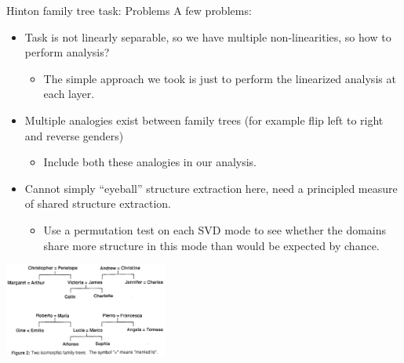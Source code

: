 \documentclass{beamer}
\begin{document}
\begin{frame}{Hinton family tree task: Problems}
A few problems:
\begin{itemize}
    \item<2-> Task is not linearly separable, so we have multiple non-linearities, so how to perform analysis?
    \begin{itemize}
	\item<3-> The simple approach we took is just to perform the linearized analysis at each layer. 
    \end{itemize}
    \item<4-> Multiple analogies exist between family trees (for example flip left to right and reverse genders) 
    \begin{itemize}
	\item<5-> Include both these analogies in our analysis. 
    \end{itemize}
    \item<6-> Cannot simply ``eyeball'' structure extraction here, need a principled measure of shared structure extraction. 
    \begin{itemize}
	\item<7-> Use a permutation test on each SVD mode to see whether the domains share more structure in this mode than would be expected by chance. 
    \end{itemize}
\end{itemize}
 {
\vspace{-80pt}
\begin{center}
    \includegraphics[width = 0.4\textwidth]{../writing/cogsci_2017/figures/hinton_family_tree_figure.png}
\end{center}
}
\end{frame}
\end{document}
